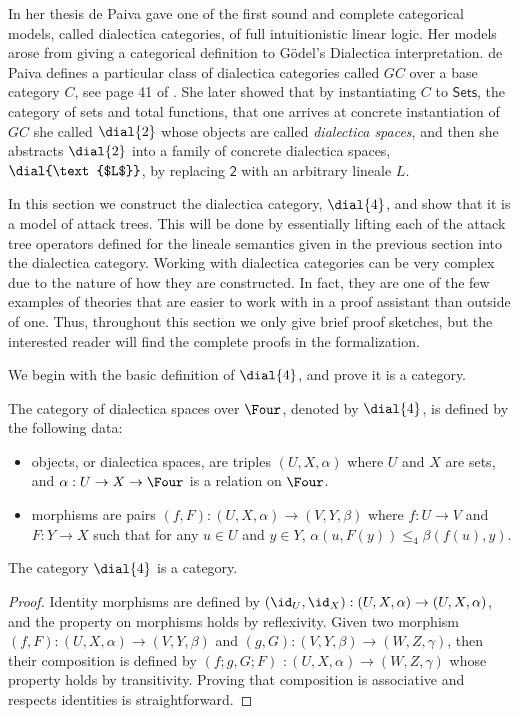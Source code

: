 In her thesis de Paiva \cite{?} gave one of the first sound and
complete categorical models, called dialectica categories, of full
intuitionistic linear logic.  Her models arose from giving a
categorical definition to G\"odel's Dialectica interpretation.  de
Paiva defines a particular class of dialectica categories called $GC$
over a base category $C$, see page 41 of \cite{dePaiva:1988}.  She
later showed that by instantiating $C$ to $\mathsf{Sets}$, the
category of sets and total functions, that one arrives at concrete
instantiation of $GC$ she called $\dial{2}$ whose objects are called
\emph{dialectica spaces}, and then she abstracts $\dial{2}$ into a
family of concrete dialectica spaces, $\dial{\text{$L$}}$, by replacing
$\mathsf{2}$ with an arbitrary lineale $L$.

In this section we construct the dialectica category, $\dial{4}$, and
show that it is a model of attack trees.  This will be done by
essentially lifting each of the attack tree operators defined for the
lineale semantics given in the previous section into the dialectica
category.  Working with dialectica categories can be very complex due
to the nature of how they are constructed.  In fact, they are one of
the few examples of theories that are easier to work with in a proof
assistant than outside of one.  Thus, throughout this section we only
give brief proof sketches, but the interested reader will find the
complete proofs in the formalization.

We begin with the basic definition of $\dial{4}$, and prove it is a
category.
\begin{definition}
  \label{def:dialectica-model}
  The category of dialectica spaces over $\Four$, denoted by
  $\dial{4}$, is defined by the following data:
  \begin{itemize}
  \item objects, or dialectica spaces, are triples $(U, X, \alpha)$
    where $U$ and $X$ are sets, and $\alpha : U \to X \to \Four$ is a
    relation on $\Four$.

  \item morphisms are pairs $(f,F) : (U,X,\alpha) \to (V,Y,\beta)$
    where $f : U \to V$ and $F : Y \to X$ such that for any $u \in U$
    and $y \in Y$, $\alpha(u,F(y)) \leq_4 \beta(f(u),y)$.
  \end{itemize}
\end{definition}

\begin{lemma}
  \label{lemma:dial4_is_a_category}
  The category $\dial{4}$ is a category.
\end{lemma}
\begin{proof}
  Identity morphisms are defined by $(\id_U, \id_X) : (U , X , \alpha)
  \to (U , X, \alpha)$, and the property on morphisms holds by
  reflexivity.  Given two morphism $(f, F) : (U , X, \alpha) \to (V ,
  Y , \beta)$ and $(g, G) : (V , Y, \beta) \to (W , Z, \gamma)$, then
  their composition is defined by $(f;g, G;F) $ $: (U , X , \alpha) \to
  (W , Z , \gamma)$ whose property holds by transitivity.  Proving
  that composition is associative and respects identities is
  straightforward.
\end{proof}

